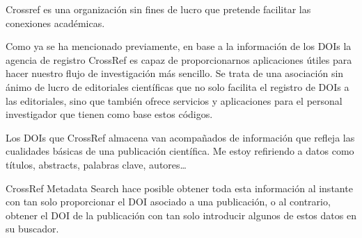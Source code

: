 Crossref es una organización sin fines de lucro que pretende facilitar las conexiones académicas.


Como ya se ha mencionado previamente, en base a la información de los DOIs la agencia de registro CrossRef es capaz de proporcionarnos aplicaciones útiles para hacer nuestro flujo de investigación más sencillo.
Se trata de una asociación sin ánimo de lucro de editoriales científicas que no solo facilita el registro de DOIs a las editoriales, sino que también ofrece servicios y aplicaciones para el personal investigador que tienen como base estos códigos.

Los DOIs que CrossRef almacena van acompañados de información que refleja las cualidades básicas de una publicación científica. Me estoy refiriendo a datos como títulos, abstracts, palabras clave, autores…

CrossRef Metadata Search hace posible obtener toda esta información al instante con tan solo proporcionar el DOI asociado a una publicación, o al contrario, obtener el DOI de la publicación con tan solo introducir algunos de estos datos en su buscador.








